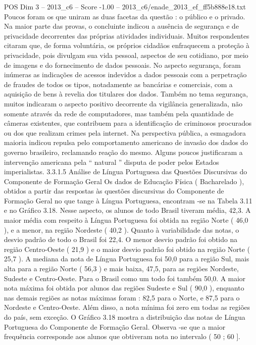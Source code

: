 \begin{textsample}{POS Dim 3 – 2013\_c6 – Score -1.00 – 2013\_c6/enade\_2013\_ef\_ff5b888e18.txt}
Poucos foram os que uniram as duas facetas da questão : o público e o privado.
Na maior parte das provas, o concluinte indicou a ausência de segurança e de privacidade decorrentes das próprias atividades individuais.
Muitos respondentes citaram que, de forma voluntária, os próprios cidadãos enfraquecem a proteção à privacidade, pois divulgam sua vida pessoal, aspectos de seu cotidiano, por meio de imagens e do fornecimento de dados pessoais.
No aspecto segurança, foram inúmeras as indicações de acessos indevidos a dados pessoais com a perpetração de fraudes de todos os tipos, notadamente as bancárias e comerciais, com a aquisição de bens à revelia dos titulares dos dados.
Também no tema segurança, muitos indicaram o aspecto positivo decorrente da vigilância generalizada, não somente através da rede de computadores, mas também pela quantidade de câmeras existentes, que contribuem para a identificação de criminosos procurados ou dos que realizam crimes pela internet.
Na perspectiva pública, a esmagadora maioria indicou repulsa pelo comportamento americano de invasão dos dados do governo brasileiro, reclamando reação do mesmo.
Alguns poucos justificaram a intervenção americana pela “ natural ” disputa de poder pelos Estados imperialistas. 3.3.1.5 Análise de Língua Portuguesa das Questões Discursivas do Componente de Formação Geral Os dados de Educação Física ( Bacharelado ), obtidos a partir das respostas às questões discursivas do Componente de Formação Geral no que tange à Língua Portuguesa, encontram -se na Tabela 3.11 e no Gráfico 3.18.
Nesse aspecto, os alunos de todo Brasil tiveram média, 42,3.
A maior média com respeito à Língua Portuguesa foi obtida na região Norte ( 46,0 ), e a menor, na região Nordeste ( 40,2 ).
Quanto à variabilidade das notas, o desvio padrão de todo o Brasil foi 22,4.
O menor desvio padrão foi obtido na região Centro-Oeste ( 21,9 ) e o maior desvio padrão foi obtido na região Norte ( 25,7 ).
A mediana da nota de Língua Portuguesa foi 50,0 para a região Sul, mais alta para a região Norte ( 56,3 ) e mais baixa, 47,5, para as regiões Nordeste, Sudeste e Centro-Oeste.
Para o Brasil como um todo foi também 50,0.
A maior nota máxima foi obtida por alunos das regiões Sudeste e Sul ( 90,0 ), enquanto nas demais regiões as notas máximas foram : 82,5 para o Norte, e 87,5 para o Nordeste e Centro-Oeste.
Além disso, a nota mínima foi zero em todas as regiões do país, sem exceção.
O Gráfico 3.18 mostra a distribuição das notas de Língua Portuguesa do Componente de Formação Geral.
Observa -se que a maior frequência corresponde aos alunos que obtiveram nota no intervalo ( 50 ; 60 ].

\end{textsample}
